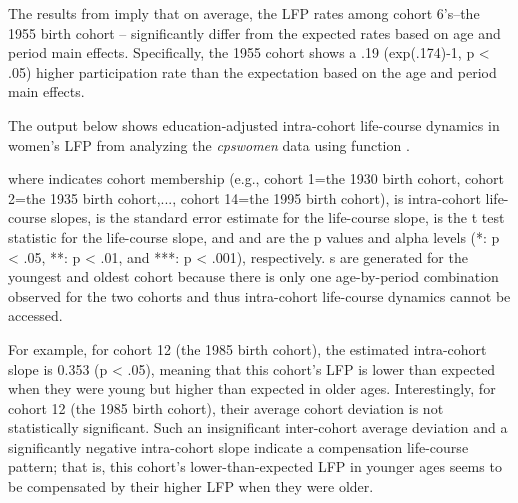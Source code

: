 The results from  imply that on average, the LFP rates among cohort 6's--the 1955 birth cohort -- significantly differ from the expected rates based on age and period main effects. Specifically, the 1955 cohort shows a .19 (exp(.174)-1, p < .05) higher participation rate than the expectation based on the age and period main effects. 

The output below shows education-adjusted intra-cohort life-course dynamics in women's LFP from analyzing the \textit{cpswomen} data using function {}.

where  indicates cohort membership (e.g., cohort 1=the 1930 birth cohort, cohort 2=the 1935 birth cohort,..., cohort 14=the 1995 birth cohort),  is intra-cohort life-course slopes,  is the standard error estimate for the life-course slope,  is the t test statistic for the life-course slope, and  and  are the p values and alpha levels (*: p < .05, **: p < .01, and ***: p < .001), respectively. s are generated for the youngest and oldest cohort because there is only one age-by-period combination observed for the two cohorts and thus intra-cohort life-course dynamics cannot be accessed. 

For example, for cohort 12 (the 1985 birth cohort), the estimated intra-cohort slope is 0.353 (p < .05), meaning that this cohort's LFP is lower than expected when they were young but higher than expected in older ages. Interestingly, for cohort 12 (the 1985 birth cohort), their average cohort deviation is not statistically significant. Such an insignificant inter-cohort average deviation and a significantly negative intra-cohort slope indicate a compensation life-course pattern; that is, this cohort's lower-than-expected LFP in younger ages seems to be compensated by their higher LFP when they were older. 

